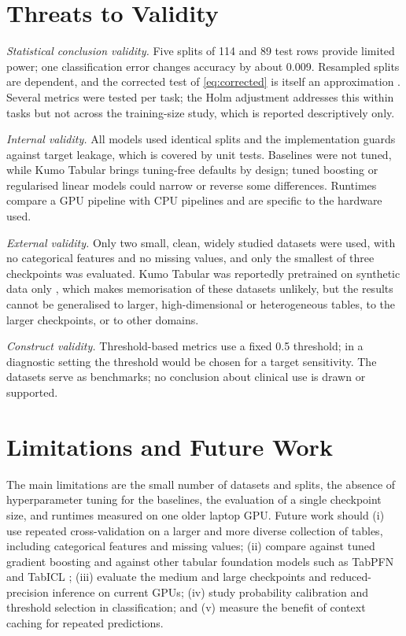 \documentclass{ieeeaccess}
\begin{document}
\section{Threats to Validity}

\emph{Statistical conclusion validity.} Five splits of 114 and 89 test rows provide limited power; one classification error changes accuracy by about 0.009. Resampled splits are dependent, and the corrected test of \eqref{eq:corrected} is itself an approximation \cite{nadeau2003inference}. Several metrics were tested per task; the Holm adjustment addresses this within tasks but not across the training-size study, which is reported descriptively only.

\emph{Internal validity.} All models used identical splits and the implementation guards against target leakage, which is covered by unit tests. Baselines were not tuned, while Kumo Tabular brings tuning-free defaults by design; tuned boosting or regularised linear models could narrow or reverse some differences. Runtimes compare a GPU pipeline with CPU pipelines and are specific to the hardware used.

\emph{External validity.} Only two small, clean, widely studied datasets were used, with no categorical features and no missing values, and only the smallest of three checkpoints was evaluated. Kumo Tabular was reportedly pretrained on synthetic data only \cite{nvidia_kumo_blog}, which makes memorisation of these datasets unlikely, but the results cannot be generalised to larger, high-dimensional or heterogeneous tables, to the larger checkpoints, or to other domains.

\emph{Construct validity.} Threshold-based metrics use a fixed 0.5 threshold; in a diagnostic setting the threshold would be chosen for a target sensitivity. The datasets serve as benchmarks; no conclusion about clinical use is drawn or supported.

\section{Limitations and Future Work}

The main limitations are the small number of datasets and splits, the absence of hyperparameter tuning for the baselines, the evaluation of a single checkpoint size, and runtimes measured on one older laptop GPU. Future work should (i) use repeated cross-validation on a larger and more diverse collection of tables, including categorical features and missing values; (ii) compare against tuned gradient boosting and against other tabular foundation models such as TabPFN \cite{hollmann2025tabpfn} and TabICL \cite{qu2025tabicl}; (iii) evaluate the medium and large checkpoints and reduced-precision inference on current GPUs; (iv) study probability calibration and threshold selection in classification; and (v) measure the benefit of context caching for repeated predictions.
\end{document}
